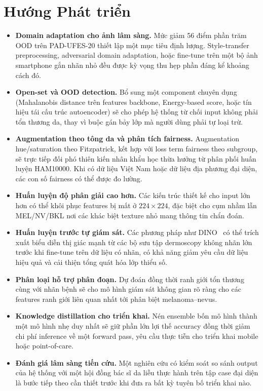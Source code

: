 \section{Hướng Phát triển}

\begin{itemize}
    \item \textbf{Domain adaptation cho ảnh lâm sàng.} Mức giảm 56 điểm phần trăm OOD trên PAD-UFES-20 thiết lập một mục tiêu định lượng. Style-transfer preprocessing, adversarial domain adaptation, hoặc fine-tune trên một bộ ảnh smartphone gắn nhãn nhỏ đều được kỳ vọng thu hẹp phần đáng kể khoảng cách đó.
    \item \textbf{Open-set và OOD detection.} Bổ sung một component chuyên dụng (Mahalanobis distance trên features backbone, Energy-based score, hoặc tín hiệu tái cấu trúc autoencoder) sẽ cho phép hệ thống từ chối input không phải tổn thương da, thay vì buộc gán bảy lớp mà người dùng phải tự loại trừ.
    \item \textbf{Augmentation theo tông da và phân tích fairness.} Augmentation hue/saturation theo Fitzpatrick, kết hợp với loss term fairness theo subgroup, sẽ trực tiếp đối phó thiên kiến nhân khẩu học thừa hưởng từ phân phối huấn luyện HAM10000. Khi có dữ liệu Việt Nam hoặc dữ liệu địa phương đại diện, các con số fairness có thể được đo lường.
    \item \textbf{Huấn luyện độ phân giải cao hơn.} Các kiến trúc thiết kế cho input lớn hơn có thể khôi phục features bị mất ở $224 \times 224$, đặc biệt cho cụm nhầm lẫn MEL/NV/BKL nơi các khác biệt texture nhỏ mang thông tin chẩn đoán.
    \item \textbf{Huấn luyện trước tự giám sát.} Các phương pháp như DINO~\cite{caron2021dino} có thể trích xuất biểu diễn thị giác mạnh từ các bộ sưu tập dermoscopy không nhãn lớn trước khi fine-tune trên dữ liệu có nhãn, có khả năng giảm yêu cầu dữ liệu hiệu quả và cải thiện tổng quát hóa lớp thiểu số.
    \item \textbf{Phân loại hỗ trợ phân đoạn.} Dự đoán đồng thời ranh giới tổn thương~\cite{hasan2020dsnet} cùng với nhãn bệnh sẽ cho mô hình giám sát không gian rõ ràng cho các features ranh giới liên quan nhất tới phân biệt melanoma--nevus.
    \item \textbf{Knowledge distillation cho triển khai.} Nén ensemble bốn mô hình thành một mô hình nhẹ duy nhất sẽ giữ phần lớn lợi thế accuracy đồng thời giảm chi phí inference về một forward pass, yêu cầu thực tiễn cho triển khai mobile hoặc point-of-care.
    \item \textbf{Đánh giá lâm sàng tiến cứu.} Một nghiên cứu có kiểm soát so sánh output của hệ thống với một hội đồng bác sĩ da liễu thực hành trên tập case đại diện là bước tiếp theo cần thiết trước khi đưa ra bất kỳ tuyên bố triển khai nào.
\end{itemize}
